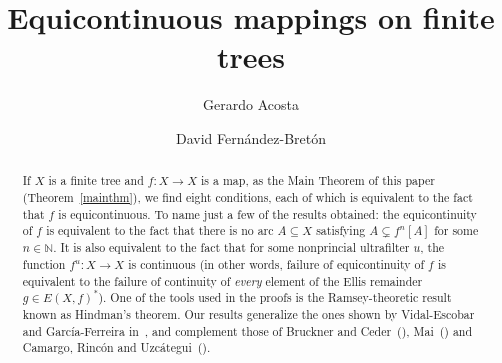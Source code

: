 \documentclass[12pt]{amsart}
\theoremstyle{definition}
\numberwithin{equation}{section}
\begin{document}

\baselineskip=17pt


\title[Equicontinuous mappings on trees]{Equicontinuous mappings on finite trees}

\author[G. Acosta]{Gerardo Acosta}
\address{Instituto de Matem\'aticas\\
Universidad Nacional Aut\'onoma de M\'exico\\
\'Area de la Investigaci\'on Cient\'{\i}fica, Circuito Exterior, Ciudad Universitaria\\ Coyoac\'an, 04510, CDMX, Mexico.
}

\author[D. Fern\'andez]{David Fern\'andez-Bret\'on}
\address{Instituto de Matem\'aticas\\
Universidad Nacional Aut\'onoma de M\'exico\\
\'Area de la Investigaci\'on Cient\'{\i}fica, Circuito Exterior, Ciudad Universitaria\\
Coyoac\'an, 04510, CDMX, Mexico.
}

\date{}


\begin{abstract}
If $X$ is a finite tree and $f \colon X \longrightarrow X$ is a map, as the Main Theorem of this
paper (Theorem~\ref{mainthm}), we find eight conditions, each of which is equivalent to the fact that $f$ is equicontinuous. To name just a few of the results obtained: the equicontinuity of $f$ is equivalent to the fact that 
there is no arc $A \subseteq X$ satisfying $A  \subsetneq f^n[A]$ for some $n\in \mathbb{N}$. It is also equivalent 
to the fact that for some nonprincial ultrafilter $u$, the function $f^u \colon X \longrightarrow X$ is continuous (in 
other words, failure of equicontinuity of $f$ is equivalent to the failure of continuity of {\it every} element of the Ellis remainder $g\in E(X,f)^*$). One of the tools used in the proofs is the Ramsey-theoretic result known as Hindman's theorem. Our results generalize the ones shown by Vidal-Escobar and Garc\'ia-Ferreira 
in~\cite{ivon-salvador}, and complement those of Bruckner and Ceder~(\cite{bruckner-ceder}), Mai~(\cite{mai}) and Camargo, Rinc\'on and Uzc\'ategui~(\cite{camargo-rincon-uzcategui}).
\end{abstract}

\end{document}
